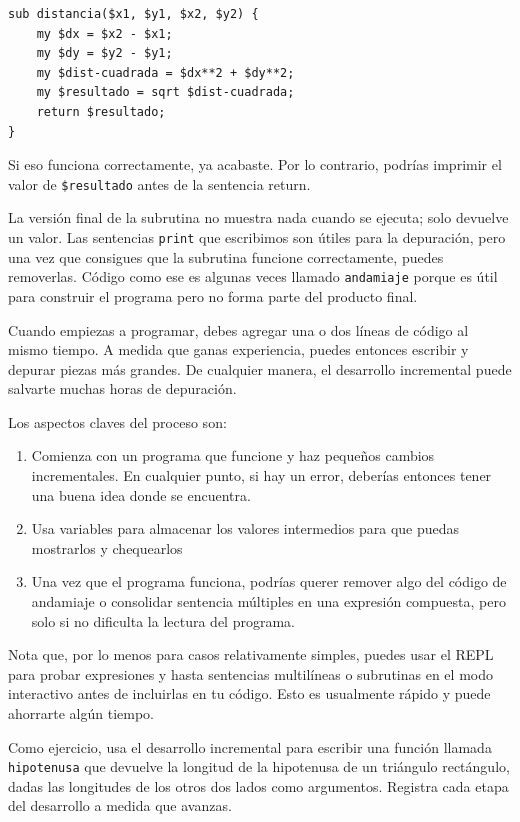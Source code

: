 \begin{lstlisting}
sub distancia($x1, $y1, $x2, $y2) {
    my $dx = $x2 - $x1;
    my $dy = $y2 - $y1;
    my $dist-cuadrada = $dx**2 + $dy**2;
    my $resultado = sqrt $dist-cuadrada;
    return $resultado;
}
\end{lstlisting}
%
Si eso funciona correctamente, ya acabaste. Por lo contrario,
podrías imprimir el valor de {\tt \$resultado} antes de la
sentencia return.

La versión final de la subrutina no muestra nada cuando se ejecuta;
solo devuelve un valor. Las sentencias {\tt print} que escribimos
son útiles para la depuración, pero una vez que consigues que la subrutina
funcione correctamente, puedes removerlas. Código como ese es algunas
veces llamado {\tt andamiaje} porque es útil para construir el programa
pero no forma parte del producto final.

Cuando empiezas a programar, debes agregar una o dos líneas de código
al mismo tiempo. A medida que ganas experiencia, puedes entonces escribir
y depurar piezas más grandes. De cualquier manera, el desarrollo incremental
puede salvarte muchas horas de depuración.

Los aspectos claves del proceso son:
\begin{enumerate}

\item Comienza con un programa que funcione y haz pequeños cambios
incrementales. En cualquier punto, si hay un error, deberías entonces
tener una buena idea donde se encuentra.

\item Usa variables para almacenar los valores intermedios
para que puedas mostrarlos y chequearlos

\item Una vez que el programa funciona, podrías querer remover
algo del código de andamiaje o consolidar sentencia múltiples
en una expresión compuesta, pero solo si no dificulta la lectura
del programa.

\end{enumerate}

Nota que, por lo menos para casos relativamente simples, 
puedes usar el REPL para probar expresiones y hasta sentencias
multilíneas o subrutinas en el modo interactivo antes de 
incluirlas en tu código. Esto es usualmente rápido y puede 
ahorrarte algún tiempo.

\label{hypotenuse}
Como ejercicio, usa el desarrollo incremental para escribir
una función llamada {\tt hipotenusa} que devuelve la longitud de
la hipotenusa de un triángulo rectángulo, dadas las longitudes de
los otros dos lados como argumentos. Registra cada etapa del
desarrollo a medida que avanzas.

